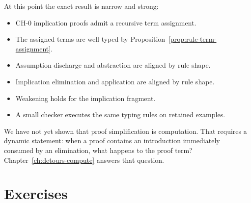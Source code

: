 At this point the exact result is narrow and strong:

\begin{itemize}
\item $\mathrm{CH}\text{-}0$ implication proofs admit a recursive term assignment.
\item The assigned terms are well typed by Proposition~\ref{prop:rule-term-assignment}.
\item Assumption discharge and abstraction are aligned by rule shape.
\item Implication elimination and application are aligned by rule shape.
\item Weakening holds for the implication fragment.
\item A small checker executes the same typing rules on retained examples.
\end{itemize}

We have not yet shown that proof simplification is computation. That requires a dynamic statement: when a proof contains an introduction immediately consumed by an elimination, what happens to the proof term? Chapter~\ref{ch:detours-compute} answers that question.

\section*{Exercises}

